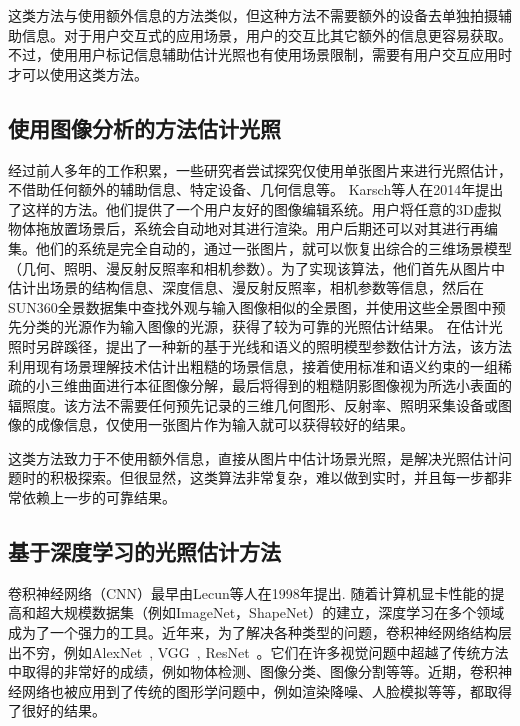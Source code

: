 这类方法与使用额外信息的方法类似，但这种方法不需要额外的设备去单独拍摄辅助信息。对于用户交互式的应用场景，用户的交互比其它额外的信息更容易获取。不过，使用用户标记信息辅助估计光照也有使用场景限制，需要有用户交互应用时才可以使用这类方法。
\subsection{使用图像分析的方法估计光照}
经过前人多年的工作积累，一些研究者尝试探究仅使用单张图片来进行光照估计，不借助任何额外的辅助信息、特定设备、几何信息等。
Karsch等人\cite{karsch2014automatic}在2014年提出了这样的方法。他们提供了一个用户友好的图像编辑系统。用户将任意的3D虚拟物体拖放置场景后，系统会自动地对其进行渲染。用户后期还可以对其进行再编集。他们的系统是完全自动的，通过一张图片，就可以恢复出综合的三维场景模型（几何、照明、漫反射反照率和相机参数）。为了实现该算法，他们首先从图片中估计出场景的结构信息、深度信息、漫反射反照率，相机参数等信息，然后在SUN360全景数据集\cite{xiao2012recognizing}中查找外观与输入图像相似的全景图，并使用这些全景图中预先分类的光源作为输入图像的光源，获得了较为可靠的光照估计结果。
\cite{chen2014lighting}在估计光照时另辟蹊径，提出了一种新的基于光线和语义的照明模型参数估计方法，该方法利用现有场景理解技术估计出粗糙的场景信息，接着使用标准和语义约束的一组稀疏的小三维曲面进行本征图像分解，最后将得到的粗糙阴影图像视为所选小表面的辐照度。该方法不需要任何预先记录的三维几何图形、反射率、照明采集设备或图像的成像信息，仅使用一张图片作为输入就可以获得较好的结果。

这类方法致力于不使用额外信息，直接从图片中估计场景光照，是解决光照估计问题时的积极探索。但很显然，这类算法非常复杂，难以做到实时，并且每一步都非常依赖上一步的可靠结果。
\subsection{基于深度学习的光照估计方法}
卷积神经网络（CNN）最早由Lecun等人\cite{lecun1998gradient}在1998年提出. 随着计算机显卡性能的提高和超大规模数据集（例如ImageNet\cite{deng2009imagenet}，ShapeNet\cite{chang2015shapenet}）的建立，深度学习在多个领域成为了一个强力的工具。近年来，为了解决各种类型的问题，卷积神经网络结构层出不穷，例如AlexNet~\cite{krizhevsky2012imagenet}, VGG~\cite{simonyan2014very}, ResNet~\cite{he2016deep}。它们在许多视觉问题中超越了传统方法中取得的非常好的成绩，例如物体检测\cite{girshick2014rich}、图像分类\cite{krizhevsky2012imagenet}、图像分割\cite{ronneberger2015u}等等。近期，卷积神经网络也被应用到了传统的图形学问题中，例如渲染降噪\cite{chaitanya2017interactive}、人脸模拟\cite{karras2017audio}等等，都取得了很好的结果。

